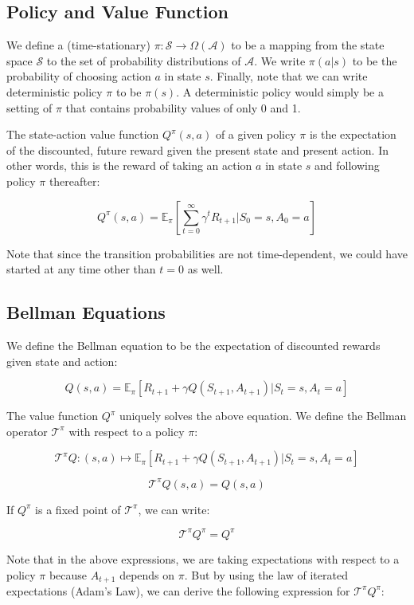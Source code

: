 \documentclass[11pt]{article}
\begin{document}
\subsection{Policy and Value Function}

We define a (time-stationary) $\pi:\mathcal{S} \to \Omega(\mathcal{A})$ to be a mapping from the state space $\mathcal{S}$ to the set of probability distributions of $\mathcal{A}$. We write $\pi(a|s)$ to be the probability of choosing action $a$ in state $s$. Finally, note that we can write deterministic policy $\pi$ to be $\pi(s)$. A deterministic policy would simply be a setting of $\pi$ that contains probability values of only 0 and 1.

The state-action value function $Q^\pi(s, a)$ of a given policy $\pi$ is the expectation of the discounted, future reward given the present state and present action. In other words, this is the reward of taking an action $a$ in state $s$ and following policy $\pi$ thereafter:

$$Q^\pi(s, a) = \mathbb{E}_\pi\left[\sum_{t=0}^\infty \gamma^t R_{t+1} | S_0 = s, A_0 = a\right]$$

Note that since the transition probabilities are not time-dependent, we could have started at any time other than $t=0$ as well.

\subsection{Bellman Equations}

We define the Bellman equation to be the expectation of discounted rewards given state and action:

$$Q(s, a) = \mathbb{E}_\pi\left[R_{t+1} + \gamma Q (S_{t+1}, A_{t+1}) | S_t = s, A_t = a \right]$$

The value function $Q^\pi$ uniquely solves the above equation. We define the Bellman operator $\mathcal{T}^\pi$ with respect to a policy $\pi$:

$$\mathcal{T}^\pi Q: (s, a) \mapsto \mathbb{E}_\pi\left[R_{t+1} + \gamma Q (S_{t+1}, A_{t+1}) | S_t = s, A_t = a \right]$$

$$\mathcal{T}^\pi Q(s, a) = Q(s,a)$$

If $Q^\pi$ is a fixed point of $\mathcal{T}^\pi$, we can write:

$$\mathcal{T}^\pi Q^\pi = Q^\pi$$

Note that in the above expressions, we are taking expectations with respect to a policy $\pi$ because $A_{t+1}$ depends on $\pi$. But by using the law of iterated expectations (Adam's Law), we can derive the following expression for $\mathcal{T}^\pi Q^\pi$:
\end{document}
